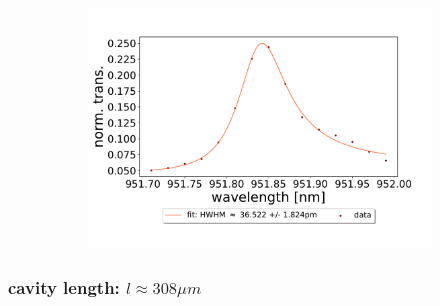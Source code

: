 \begin{figure}[h!]
\begin{subfigure}[b]{0.49\textwidth}
        \includegraphics[width=\textwidth]{figures/results/double fano fits/550um_M3:M5_fit_5.pdf}
        \caption{}
        \label{fig:550um_M3:M5_fit_5}
    \end{subfigure}
\end{figure}

\clearpage
\subsubsection*{cavity length: $l \approx 308 \mu m$}

